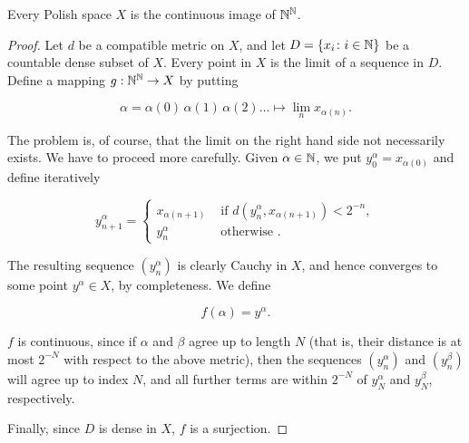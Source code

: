 \begin{theorem}\label{thm-polish-cont-image-baire}Every Polish space $X$ is the continuous image of $\mathbb{N}^{\mathbb{N}}$.

\end{theorem}\begin{proof}Let $d$ be a compatible metric on $X$, and let $D = \{x_i \colon i \in \mathbb{N}\}$ be a countable dense subset of $X$. Every point in $X$ is the limit of a sequence in $D$. Define a mapping $g:\mathbb{N}^{\mathbb{N}} \to X$ by putting

\begin{equation}
\alpha = \alpha(0)\, \alpha(1)\, \alpha(2)\dots \mapsto \lim_n x_{\alpha(n)}.
\end{equation}

The problem is, of course, that the limit on the right hand side not necessarily exists. We have to proceed more carefully.
Given $\alpha \in \mathbb{N}$, we put $y^\alpha_0 = x_{\alpha(0)}$ and
define iteratively

\begin{equation}
y^\alpha_{n+1} = \begin{cases}
    x_{\alpha(n+1)} & \text{ if $d(y^\alpha_n,x_{\alpha(n+1)}) < 2^{-n}$}, \\
    y^\alpha_n & \text{ otherwise }.
\end{cases}
\end{equation}

The resulting sequence $(y^\alpha_n)$ is clearly Cauchy in $X$, and hence converges to some point $y^\alpha \in X$, by completeness. We define

\begin{equation}
f(\alpha) = y^\alpha.
\end{equation}

$f$ is continuous, since if $\alpha$ and $\beta$ agree up to length $N$ (that is, their distance is at most $2^{ -N}$ with respect to the above metric), then the sequences $(y^\alpha_n)$ and $(y^\beta_n)$ will agree up to index $N$, and all further terms are within $2^{ -N}$ of $y^\alpha_N$ and $y^\beta_N$, respectively.

Finally, since $D$ is dense in $X$, $f$ is a surjection.

\end{proof}